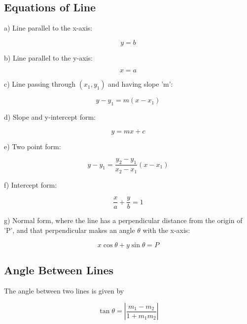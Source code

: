 \documentclass{article}
\begin{document}
\subsection{Equations of Line}

a) Line parallel to the x-axis:

\begin{equation}
y = b
\end{equation}

b) Line parallel to the y-axis:

\begin{equation}
x = a
\end{equation}

c) Line passing through \((x_1, y_1)\) and having slope 'm':

\begin{equation}
y - y_1 = m(x - x_1)
\end{equation}

d) Slope and y-intercept form:

\begin{equation}
y = mx + c
\end{equation}

e) Two point form:

\begin{equation}
y - y_1 = \frac{y_2 - y_1}{x_2 - x_1} (x - x_1)
\end{equation}

f) Intercept form:

\begin{equation}
\frac{x}{a} + \frac{y}{b} = 1
\end{equation}

g) Normal form, where the line has a perpendicular distance from the origin of 'P', and that perpendicular makes an angle \(\theta\) with the x-axis:

\begin{equation}
x \cos \theta + y \sin \theta = P
\end{equation}

\subsection{Angle Between Lines}

The angle between two lines is given by

\begin{equation}
\tan \theta = \left| \frac{m_1 - m_2}{1 + m_1 m_2} \right|
\end{equation}
\end{document}
